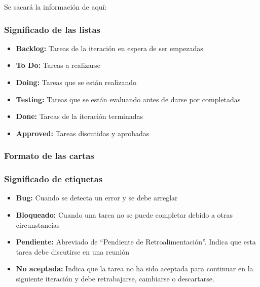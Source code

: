 
Se sacará la información de aquí:
\cite{Brechner2015-dv} %
\subsubsection{Significado de las listas}

\begin{itemize}
    \item \textbf{Backlog:} Tareas de la iteración en espera de ser empezadas
    \item \textbf{To Do:} Tareas a realizarse
    \item \textbf{Doing:} Tareas que se están realizando
    \item \textbf{Testing:} Tareas que se están evaluando antes de darse por completadas
    \item \textbf{Done:} Tareas de la iteración terminadas
    \item \textbf{Approved:} Tareas discutidas y aprobadas
\end{itemize}

\subsubsection{Formato de las cartas}




\subsubsection{Significado de etiquetas}
\begin{itemize}
    \item \textbf{Bug:} Cuando se detecta un error y se debe arreglar
    \item \textbf{Bloqueado:} Cuando una tarea no se puede completar debido a
    otras circunstancias
    \item \textbf{Pendiente:} Abreviado de “Pendiente de Retroalimentación”.
    Indica que esta tarea debe discutirse en una reunión
    \item \textbf{No aceptada:} Indica que la tarea no ha sido aceptada para
    continuar en la siguiente iteración y debe retrabajarse, cambiarse o
    descartarse.
\end{itemize}

